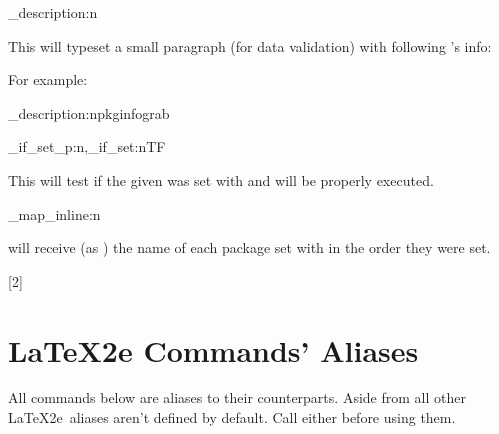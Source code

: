 \documentclass[10pt]{article}
\begin{document}
\begin{codedescribe}{\pkginfograb_description:n}
\begin{codesyntax}%
\end{codesyntax}
This will typeset a small paragraph (for data validation) with following 's info: 
\end{codedescribe}
For example:
\begin{codestore}[demoD]
\ExplSyntaxOn
\pkginfograb_description:n{pkginfograb}
\ExplSyntaxOff
\end{codestore}



\begin{codedescribe}[code,EXP,new=2025/11/01]{\pkginfograb_if_set_p:n,\pkginfograb_if_set:nTF}
\begin{codesyntax}%
\end{codesyntax}
This will test if the given  was set with  and  will be properly executed.
\end{codedescribe}


\begin{codedescribe}[code,new=2025/11/01]{\pkginfograb_map_inline:n}
\begin{codesyntax}%
\end{codesyntax}
 will receive (as ) the name of each package set with  in the order they were set.
\end{codedescribe}



[2]


\section{LaTeX2e Commands' Aliases}\label{2e-cmds}
All commands below are aliases to their  counterparts. Aside from \tsobj{\PkgInfoSetAliases} all other \LaTeX2e\ aliases aren't defined by default. Call either  before using them.
\end{document}
